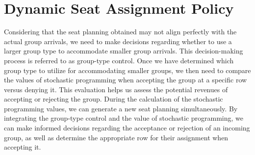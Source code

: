 \section{Dynamic Seat Assignment Policy}

Considering that the seat planning obtained may not align perfectly with the actual group arrivals, we need to make decisions regarding whether to use a larger group type to accommodate smaller group arrivals. This decision-making process is referred to as group-type control. Once we have determined which group type to utilize for accommodating smaller groups, we then need to compare the values of stochastic programming when accepting the group at a specific row versus denying it. This evaluation helps us assess the potential revenues of accepting or rejecting the group. During the calculation of the stochastic programming values, we can generate a new seat planning simultaneously. By integrating the group-type control and the value of stochastic programming, we can make informed decisions regarding the acceptance or rejection of an incoming group, as well as determine the appropriate row for their assignment when accepting it.





